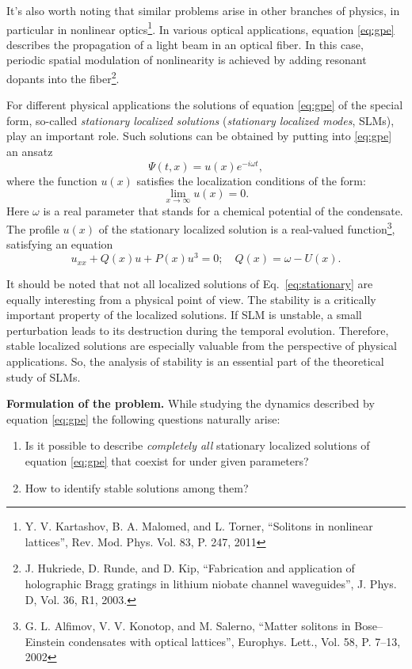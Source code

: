 \documentclass[candidate, href, colorlinks]{disser}
\begin{document}
It's also worth noting that similar problems arise in other branches of physics, in particular in nonlinear optics\footnote{\label{note:turner} Y. V. Kartashov, B. A. Malomed, and L. Torner, ``Solitons in nonlinear lattices'', Rev. Mod. Phys. Vol. 83, P. 247, 2011}.
In various optical applications, equation \eqref{eq:gpe} describes the propagation of a light beam in an optical fiber.
In this case, periodic spatial modulation of nonlinearity is achieved by adding resonant dopants into the fiber\footnote{J. Hukriede, D. Runde, and D. Kip, ``Fabrication and application of holographic Bragg gratings in lithium niobate channel waveguides'', J. Phys. D, Vol. 36, R1, 2003.}.

For different physical applications the solutions of equation \eqref{eq:gpe} of the special form, so-called {\it stationary localized solutions} ({\it stationary localized modes}, SLMs), play an important role.
Such solutions can be obtained by putting into \eqref{eq:gpe} an ansatz
\begin{equation}
	\Psi(t, x) = u(x) e^{-i \omega t},
\label{eq:ansatz}
\end{equation}
where the function $u(x)$ satisfies the localization conditions of the form:
\begin{equation}
	\lim \limits_{x \to \infty} u(x) = 0.
\label{eq:localization}
\end{equation}
Here $\omega$ is a real parameter that stands for a chemical potential of the condensate.
The profile $u(x)$ of the stationary localized solution is a real-valued function\footnote{G. L. Alfimov, V. V. Konotop, and M. Salerno, ``Matter solitons in Bose--Einstein condensates with optical lattices'', Europhys. Lett., Vol. 58, P. 7--13, 2002}, satisfying an equation
\begin{equation}
	u_{xx} + Q(x) u + P(x) u^3 = 0; \quad Q(x) = \omega - U(x).
\label{eq:stationary}
\end{equation}

It should be noted that not all localized solutions of Eq.~\eqref{eq:stationary} are equally interesting from a physical point of view.
The stability is a critically important property of the localized solutions.
If SLM is unstable, a small perturbation leads to its destruction during the temporal evolution.
Therefore, stable localized solutions are especially valuable from the perspective of physical applications.
So, the analysis of stability is an essential part of the theoretical study of SLMs.

\textbf{Formulation of the problem.}
While studying the dynamics described by equation \eqref{eq:gpe} the following questions naturally arise:
\begin{enumerate}
	\item Is it possible to describe {\it completely all} stationary localized solutions of equation \eqref{eq:gpe} that coexist for under given parameters?
	\item How to identify stable solutions among them?
\end{enumerate}
\end{document}
